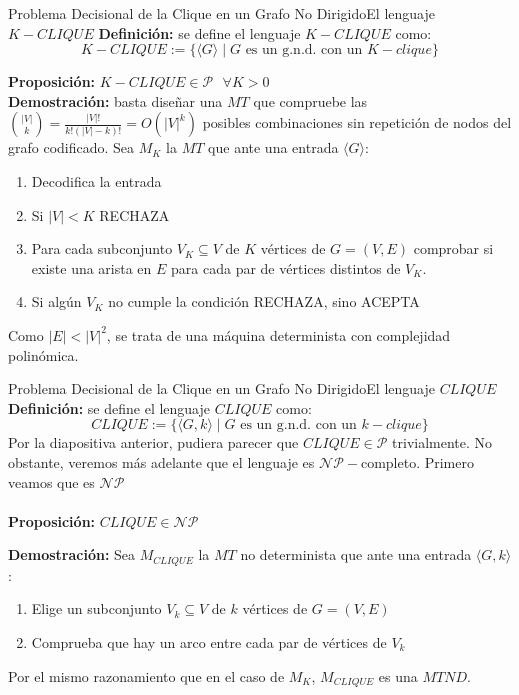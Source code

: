 \documentclass[10pt, envcountsect, presentation, aspectratio=169]{beamer}
\begin{document}
\begin{frame}{Problema Decisional de la Clique en un Grafo No Dirigido}{El lenguaje $K-CLIQUE$}
    \textbf{Definición:} se define el lenguaje $K-CLIQUE$ como:
    $$
    K-CLIQUE:=\{\langle G \rangle \mid G \text{ es un g.n.d. con un } K-clique\}
    $$

    \textbf{Proposición:} $K-CLIQUE \in \mathcal{P} \text{  } \forall K>0$ \\
    \textbf{Demostración:} basta diseñar una $MT$ que compruebe las $\binom{|V|}{k} = \frac{|V|!}{k!(|V|-k)!}=O(|V|^k)$ posibles combinaciones sin repetición de nodos del grafo codificado. Sea $M_K$ la $MT$ que ante una entrada $\langle G \rangle$:
    \begin{enumerate}[I]
        \item Decodifica la entrada
        \item Si $|V|<K$ RECHAZA
        \item Para cada subconjunto $V_K\subseteq V$ de $K$ vértices de $G=(V,E)$ comprobar si existe una arista en $E$ para cada par de vértices distintos de $V_K$.
        \item Si algún $V_K$ no cumple la condición RECHAZA, sino ACEPTA
    \end{enumerate}
    Como $|E|<|V|^2$, se trata de una máquina determinista con complejidad polinómica.
\end{frame}

\begin{frame}{Problema Decisional de la Clique en un Grafo No Dirigido}{El lenguaje $CLIQUE$}
    \textbf{Definición:} se define el lenguaje $CLIQUE$ como:
    $$
    CLIQUE:=\{\langle G, k \rangle \mid G \text{ es un g.n.d. con un } k-clique\}
    $$
    Por la diapositiva anterior, pudiera parecer que $CLIQUE \in \mathcal{P}$ trivialmente.
    No obstante, veremos más adelante que el lenguaje es $\mathcal{NP}-$completo. Primero veamos que es $\mathcal{NP}$ \\~\\

    \textbf{Proposición:} $CLIQUE \in \mathcal{NP}$

    \textbf{Demostración: } Sea $M_{CLIQUE}$ la $MT$ no determinista que ante una entrada $\langle G, k \rangle$:

    \begin{enumerate}[I]
        \item Elige un subconjunto $V_k \subseteq V$ de $k$ vértices de $G=(V,E)$
        \item Comprueba que hay un arco entre cada par de vértices de $V_k$
    \end{enumerate}

    Por el mismo razonamiento que en el caso de $M_K$, $M_{CLIQUE}$ es una $MTND$.
\end{frame}
\end{document}
